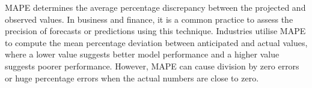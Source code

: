 MAPE determines the average percentage discrepancy between the projected and observed values. In business and finance,  it is a common practice to assess the precision of forecasts or predictions using this technique. Industries utilise MAPE to compute the mean percentage deviation between anticipated and actual values,  where a lower value suggests better model performance and a higher value suggests poorer performance. However,  MAPE can cause division by zero errors or huge percentage errors when the actual numbers are close to zero.



